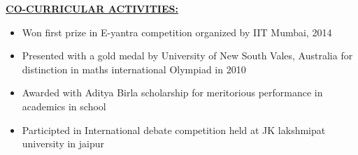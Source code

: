 \documentclass{article}
\begin{document}
				\underline{\textbf{CO-CURRICULAR ACTIVITIES:}}\\
				\begin{itemize}
					\item Won first prize in E-yantra competition organized by IIT Mumbai, 2014
					\item Presented with a gold medal by University of New South Vales, Australia for distinction in maths international Olympiad in 2010
					\item Awarded with Aditya Birla scholarship for meritorious performance in academics in school
					\item Participted in International debate competition held at JK lakshmipat university in jaipur
					\\[\baselineskip] 
				\end{itemize}
			
\end{document}
